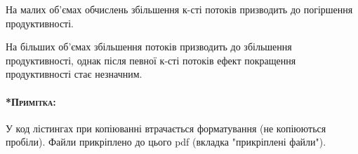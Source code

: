 \documentclass{udstu}
\begin{document}
На малих об'ємах обчислень збільшення к-сті потоків призводить до погіршення продуктивності.

На більших об'ємах збільшення потоків призводить до збільшення продуктивності,
однак після певної к-сті потоків ефект покращення продуктивності стає незначним.


\paragraph{\textsc{*Примітка:}}
У код лістингах при копіюванні втрачається форматування (не копіюються пробіли).
Файли прикріплено до цього pdf (вкладка "прикріплені файли").

\inputminted{rust}{../src/lineareq.rs}

\inputminted{rust}{../src/lib.rs}

\inputminted{rust}{../src/main.rs}
\end{document}
